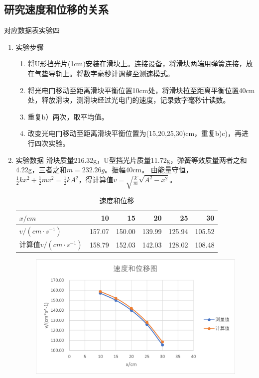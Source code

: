 \documentclass[11pt]{article}
\begin{document}
\subsection{研究速度和位移的关系}
对应数据表实验四
\begin{enumerate}
    \item 实验步骤
    \begin{enumerate}
        \item 将U形挡光片(1cm)安装在滑块上。连接设备，将滑块两端用弹簧连接，放在气垫导轨上。将数字毫秒计调整至测速模式。
        \item 将光电门移动至距离滑块平衡位置10cm处，将滑块拉至距离平衡位置40cm处，释放滑块，测滑块经过光电门的速度，记录数字毫秒计读数。
        \item 重复b）两次，取平均值。
        \item 改变光电门移动至距离滑块平衡位置为(15,20,25,30)cm，重复b)c)，再进行四次实验。
    \end{enumerate}
    \item 实验数据
    \newline 滑块质量216.32g，U型挡光片质量11.72g，弹簧等效质量两者之和4.22g，三者之和$m=232.26g$。振幅40cm。
    \newline 由能量守恒，$\frac{1}{2}kx^{2}+\frac{1}{2}mv^{2}=\frac{1}{2}kA^2$，得计算值$v=\sqrt{\frac{k}{m}} \sqrt{A^{2}-x^{2}}$。
        \begin{table}[H]
          \centering
          \caption{速度和位移}
            \begin{tabular}{|l|r|r|r|r|r|}\hline
            $x/cm$   & 10     & 15     & 20     & 25     & 30 \\\hline
            $v/(cm \cdot s^{-1})$ & 157.07  & 150.00  & 139.99  & 125.94  & 105.52  \\\hline
            计算值$v/(cm \cdot s^{-1})$ & 158.79  & 152.03  & 142.03  & 128.02  & 108.48  \\\hline
            \end{tabular}%
          \label{tab:速度和位移}%
        \end{table}%
        \begin{figure}[H]
            \centering
            \includegraphics[width=12cm]{Fig/速度和位移.png}

\end{figure}
\end{enumerate}
\end{document}
